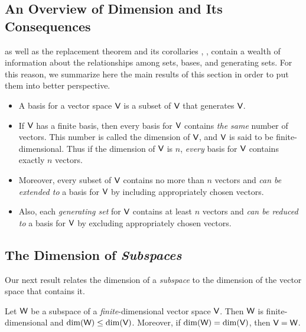 \subsection{An Overview of Dimension and Its Consequences}
 as well as the replacement theorem  and its corollaries , , 
contain a wealth of information about the relationships among \LID{} sets, bases, and generating sets.
For this reason, we summarize here the main results of this section in order to put them into better perspective.
\begin{itemize}
\item A basis for a vector space \(\textsf{V}\) is a \LID{} subset of \(\textsf{V}\) that generates \(\textsf{V}\).
\item If \(\textsf{V}\) has a finite basis, then every basis for \(\textsf{V}\) contains \emph{the same} number of vectors.
    This number is called the dimension of \(\textsf{V}\), and \(\textsf{V}\) is said to be finite-dimensional.
    Thus if the dimension of \(\textsf{V}\) is \(n\), \emph{every} basis for \(\textsf{V}\) contains exactly \(n\) vectors.
\item Moreover, every \emph{\LID{}} subset of \(\textsf{V}\) contains no more than \(n\) vectors and \emph{can be extended to} a basis for \(\textsf{V}\) by including appropriately chosen vectors.
\item Also, each \emph{generating set} for \(\textsf{V}\) contains at least \(n\) vectors and \emph{can be reduced to} a basis for \(\textsf{V}\) by excluding appropriately chosen vectors.
\end{itemize}

\subsection{The Dimension of \emph{Subspaces}}
Our next result relates the dimension of a \emph{subspace} to the dimension of the vector space that contains it.

\begin{theorem} \label{thm 1.11}
Let \(\textsf{W}\) be a subspace of a \emph{finite}-dimensional vector space \(\textsf{V}\).
Then  \(\textsf{W}\) is finite-dimensional and \(\dim(\textsf{W}) \le \dim(\textsf{V})\).
 Moreover, if \(\dim(\textsf{W}) = \dim(\textsf{V})\), then \(\textsf{V} = \textsf{W}\).
\end{theorem}

